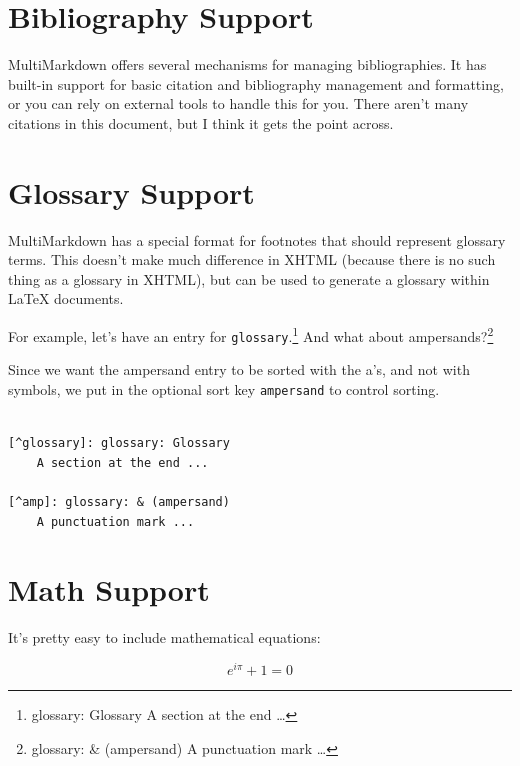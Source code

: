 \documentclass[oneside,article]{memoir}
\begin{document}
\section{Bibliography Support}
\label{bibliographysupport}

MultiMarkdown offers several mechanisms for managing bibliographies. It has
built-in support for basic citation and bibliography management and
formatting, or you can rely on external tools to handle this for you. There
aren't many citations in this document, but I think it gets the point
across.~\cite[p. 42]{fake}


\section{Glossary Support}
\label{glossarysupport}

MultiMarkdown has a special format for footnotes that should represent
glossary terms. This doesn't make much difference in XHTML (because there is
no such thing as a glossary in XHTML), but can be used to generate a glossary
within LaTeX documents.


For example, let's have an entry for \texttt{glossary}.\footnote{glossary: Glossary 
A section at the end {\ldots}} And what about
ampersands?\footnote{glossary: \& (ampersand)
A punctuation mark {\ldots}}


Since we want the ampersand entry to be sorted with the a's, and not with
symbols, we put in the optional sort key \texttt{ampersand} to control sorting.


\begin{adjustwidth}{2.5em}{2.5em}
\begin{verbatim}

[^glossary]: glossary: Glossary 
    A section at the end ...

[^amp]: glossary: & (ampersand)
    A punctuation mark ...

\end{verbatim}
\end{adjustwidth}

\section{Math Support}
\label{mathsupport}

It's pretty easy to include mathematical equations:


\begin{equation}
\label{eulersidentity}
{e}^{i\pi }+1=0
\end{equation}
\end{document}
